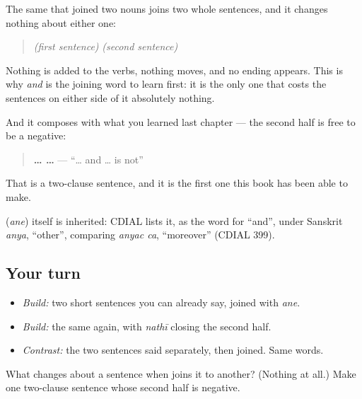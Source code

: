 \begin{cousinweb}
The same \textbf{} that joined two nouns joins two whole sentences, and it changes nothing about either one:

\begin{quote}
\emph{(first sentence)} \textbf{} \emph{(second sentence)}
\end{quote}

Nothing is added to the verbs, nothing moves, and no ending appears. This is why \emph{and} is the joining word to learn first: it is the only one that costs the sentences on either side of it absolutely nothing.

And it composes with what you learned last chapter — the second half is free to be a negative:

\begin{quote}
\textbf{…  … } — \textquotedblleft{}… and … is not\textquotedblright{}
\end{quote}

That is a two-clause sentence, and it is the first one this book has been able to make.

\textbf{} (\emph{ane}) itself is inherited: CDIAL lists it, as the word for \textquotedblleft{}and\textquotedblright{}, under Sanskrit \emph{anya}, \textquotedblleft{}other\textquotedblright{}, comparing \emph{anyac ca}, \textquotedblleft{}moreover\textquotedblright{} (CDIAL 399).
\end{cousinweb}

\subsection*{Your turn}
\begin{itemize}
\raggedright
  \item \emph{Build:} two short sentences you can already say, joined with \emph{ane}.
  \item \emph{Build:} the same again, with \emph{nathī} closing the second half.
  \item \emph{Contrast:} the two sentences said separately, then joined. Same words.
\end{itemize}

\begin{tcolorbox}[breakable,colback=teal!4,colframe=teal!35!black,title={Before you move on}]
What changes about a sentence when \textbf{} joins it to another? (Nothing at all.) Make one two-clause sentence whose second half is negative.
\end{tcolorbox}
